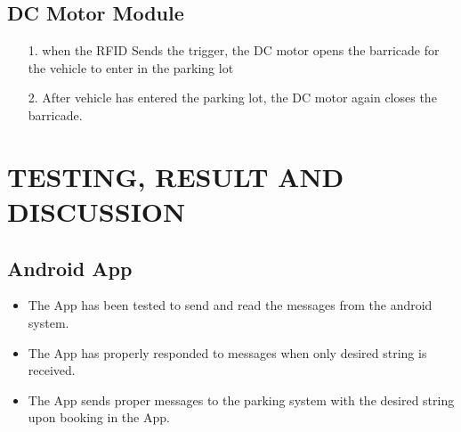 \documentclass[12pt,a4paper]{report}
\begin{document}
\section{DC Motor Module}
\begin{itemize}
	\item [1.] when the RFID Sends the trigger, the DC motor opens the barricade for the vehicle to enter in the parking lot
	\item [2.] After vehicle has entered the parking lot, the DC motor again closes the barricade. 
\end{itemize}
\chapter{TESTING, RESULT AND DISCUSSION}
\newpage

\section{Android App}
\begin{itemize}
	\item The App has been tested to send and read the messages from the android system. 
	\item The App has properly responded to messages when only desired string is received.
	\item The App sends proper messages to the parking system with the desired string upon booking in the App.
\end{itemize}
\end{document}
